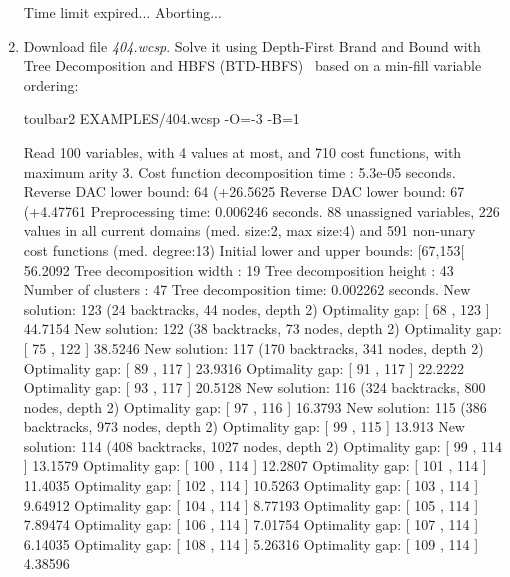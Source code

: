 \begin{enumerate}
{\begin{DoxyCode}
Time limit expired... Aborting...
\end{DoxyCode}}
\item Download file {\em 404.wcsp}. Solve it using Depth-First Brand and Bound with Tree Decomposition and HBFS (BTD-HBFS)~\cite{Schiex06a} based on a min-fill variable ordering:
\begin{DoxyCode}
	toulbar2 EXAMPLES/404.wcsp -O=-3 -B=1
\end{DoxyCode}
{\scriptsize
\begin{DoxyCode}
Read 100 variables, with 4 values at most, and 710 cost functions, with maximum arity 3.
Cost function decomposition time : 5.3e-05 seconds.
Reverse DAC lower bound: 64 (+26.5625%
Reverse DAC lower bound: 67 (+4.47761%
Preprocessing time: 0.006246 seconds.
88 unassigned variables, 226 values in all current domains (med. size:2, max size:4) and 591 non-unary cost functions (med. degree:13)
Initial lower and upper bounds: [67,153[ 56.2092%
Tree decomposition width  : 19
Tree decomposition height : 43
Number of clusters        : 47
Tree decomposition time: 0.002262 seconds.
New solution: 123 (24 backtracks, 44 nodes, depth 2)
Optimality gap: [ 68 , 123 ] 44.7154 %
New solution: 122 (38 backtracks, 73 nodes, depth 2)
Optimality gap: [ 75 , 122 ] 38.5246 %
New solution: 117 (170 backtracks, 341 nodes, depth 2)
Optimality gap: [ 89 , 117 ] 23.9316 %
Optimality gap: [ 91 , 117 ] 22.2222 %
Optimality gap: [ 93 , 117 ] 20.5128 %
New solution: 116 (324 backtracks, 800 nodes, depth 2)
Optimality gap: [ 97 , 116 ] 16.3793 %
New solution: 115 (386 backtracks, 973 nodes, depth 2)
Optimality gap: [ 99 , 115 ] 13.913 %
New solution: 114 (408 backtracks, 1027 nodes, depth 2)
Optimality gap: [ 99 , 114 ] 13.1579 %
Optimality gap: [ 100 , 114 ] 12.2807 %
Optimality gap: [ 101 , 114 ] 11.4035 %
Optimality gap: [ 102 , 114 ] 10.5263 %
Optimality gap: [ 103 , 114 ] 9.64912 %
Optimality gap: [ 104 , 114 ] 8.77193 %
Optimality gap: [ 105 , 114 ] 7.89474 %
Optimality gap: [ 106 , 114 ] 7.01754 %
Optimality gap: [ 107 , 114 ] 6.14035 %
Optimality gap: [ 108 , 114 ] 5.26316 %
Optimality gap: [ 109 , 114 ] 4.38596 %

\end{DoxyCode}}
\end{enumerate}
